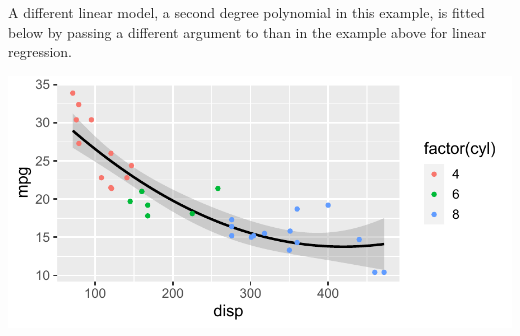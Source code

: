 \documentclass[krantz2]{krantz}\usepackage{knitr}
\begin{document}
\begin{knitrout}\footnotesize
{}\color{fgcolor}\begin{kframe}
\begin{alltt}
 \hlopt{+} \hlstd{(} \hlstd{=}  \hlopt{+}
  \hlstd{(} \hlstd{=} \hlstd{,}   \hlopt{~}   \hlstd{=} \hlstd{)}
\end{alltt}
\end{kframe}
\end{knitrout}

A different linear model, a second degree polynomial in this example, is fitted below by passing a different argument to  than in the example above for linear regression.

\begin{knitrout}\footnotesize
{}\color{fgcolor}\begin{kframe}
\begin{alltt}
 \hlopt{+} \hlstd{(} \hlstd{=}  \hlopt{+}
  \hlstd{(} \hlstd{=} \hlstd{,}   \hlopt{~}  \hlstd{),}  \hlstd{=} \hlstd{)}
\end{alltt}
\end{kframe}

{\centering \includegraphics[width=.7\textwidth]{figure/pos-smooth-plot-06-1} 

}


\end{knitrout}
\end{document}
